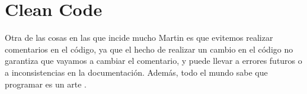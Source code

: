 \section{Clean Code}
Otra de las cosas en las que incide mucho Martin es que evitemos realizar comentarios en el c\'odigo,
ya que el hecho de realizar un cambio en el c\'odigo no garantiza que vayamos a cambiar el comentario, y 
puede llevar a errores futuros o a inconsistencias en la documentaci\'on. Adem\'as, todo el mundo sabe que programar
es un arte \cite{Art:Programming}.
